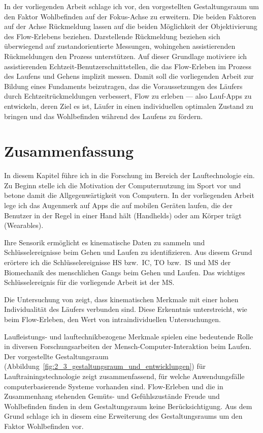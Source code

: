 In der vorliegenden Arbeit schlage ich vor, den vorgestellten Gestaltungsraum um den Faktor Wohlbefinden auf der Fokus-Achse zu erweitern. Die beiden Faktoren auf der Achse Rückmeldung lassen auf die beiden Möglichkeit der Objektivierung des Flow-Erlebens beziehen. Darstellende Rückmeldung beziehen sich überwiegend auf zustandorientierte Messungen, wohingehen assistierenden Rückmeldungen den Prozess unterstützen. Auf dieser Grundlage motiviere ich assistierenden Echtzeit-Benutzerschnittstellen, die das Flow-Erleben im Prozess des Laufens und Gehens implizit messen. Damit soll die vorliegenden Arbeit zur Bildung eines Fundaments beizutragen, das die Voraussetzungen des Läufers durch Echtzeitrückmeldungen verbessert, Flow zu erleben --- also Lauf-Apps zu entwickeln, deren Ziel es ist, Läufer in einen individuellen optimalen Zustand zu bringen und das Wohlbefinden während des Laufens zu fördern.

\section{Zusammenfassung} 

\label{sec:zusammenfassung}

In diesem Kapitel führe ich in die Forschung im Bereich der Lauftechnologie ein. Zu Beginn stelle ich die Motivation der Computernutzung im Sport vor und betone damit die Allgegenwärtigkeit von Computern. In der vorliegenden Arbeit lege ich das Augenmerk auf Apps die auf mobilen Geräten laufen, die der Benutzer in der Regel in einer Hand hält (Handhelds) oder am Körper trägt (Wearables).

Ihre Sensorik ermöglicht es kinematische Daten zu sammeln und Schlüsselereignisse beim Gehen und Laufen zu identifizieren. Aus diesem Grund erörtere ich die Schlüsselereignisse \ac{HS} bzw.\ \ac{IC}, \ac{TO} bzw.\ \ac{IS} und \ac{MS} der Biomechanik des menschlichen Gangs beim Gehen und Laufen. Das wichtiges Schlüsselereignis für die vorliegende Arbeit ist der \acf{MS}.

Die Untersuchung von \citet{Strohrmann2012} zeigt, dass kinematischen Merkmale mit einer hohen Individualität des Läufers verbunden sind. Diese Erkenntnis unterstreicht, wie beim Flow-Erleben, den Wert von intraindividuellen Untersuchungen.

Laufleistungs- und lauftechnikbezogene Merkmale spielen eine bedeutende Rolle in diversen Forschungsarbeiten der Mensch-Computer-Interaktion beim Laufen. Der vorgestellte Gestaltungsraum (Abbildung~\ref{fig:2_3_gestaltungsraum_und_entwicklungen}) für Lauftrainingstechnologie zeigt zusammenfassend, für welche Anwendungsfälle computerbasierende Systeme vorhanden sind. Flow-Erleben und die in Zusammenhang stehenden Gemüts- und Gefühlszustände Freude und Wohlbefinden finden in dem Gestaltungsraum keine Berücksichtigung. Aus dem Grund schlage ich in diesem eine Erweiterung des Gestaltungsraums um den Faktor Wohlbefinden vor.


